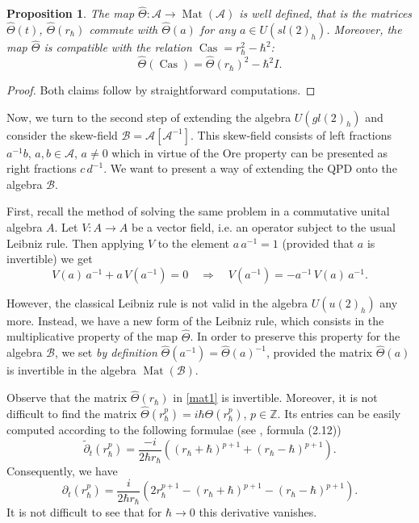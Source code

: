 \documentclass[10pt,a4paper]{amsart}
\newcommand{\pa}{\partial}
\renewcommand{\AA}{\mathcal{A}}
\DeclareMathOperator{\Cas}{Cas}
\newcommand{\tpa}{\widetilde{\pa}}
\newcommand{\hh}{\hbar}
\newcommand{\hatt}{\widehat{\Theta}}
\DeclareMathOperator{\Mat}{Mat}
\newcommand{\rh}{r_{\hbar}}
\newcommand{\Ah}{\mathcal{B}}
\numberwithin{equation}{section}
\newtheorem{proposition}[theorem]{Proposition}
\begin{document}
\begin{proposition}
The map $\hatt: \AA\to {\Mat}(\AA)$ is well defined, that is the matrices  $\hatt(t)$, $\hatt(\rh)$ commute with $\hatt(a)$
for any $ a\in U(sl(2)_h)$. Moreover, the map $\hatt$ is compatible with the relation ${\Cas}=\rh^2-\hh^2$:
\begin{equation}
\hatt({\Cas})=\hatt({\rh})^2-\hh^2 {I}.
\label{ree}
\end{equation}
\end{proposition}

\begin{proof}
Both claims follow by straightforward computations.
\end{proof}


Now, we turn to the second step of extending the algebra $U(gl(2)_h)$ and consider the skew-field $\Ah=\AA[\AA^{-1}]$. This
skew-field consists of left fractions $a^{-1} b$, $a,b \in\AA$, $a\not=0$ which in virtue of the Ore property can be presented as
right fractions $c\,d^{-1}$. We want to present a way of extending the QPD onto the algebra $\Ah$.

First, recall the method of solving the same problem in a commutative unital algebra $A$.
Let  $V:A\to A$ be a vector field,  i.e. an operator  subject to the usual Leibniz rule.
Then applying $V$ to the element $a\,a^{-1}=1$ (provided that $a$ is invertible) we get
\[
V(a)\,a^{-1}+a\,V(a^{-1})=0\quad \Rightarrow\quad V(a^{-1})=- a^{-1}\, V(a)\, a^{-1}.
\]

However, the classical Leibniz rule is not valid in the algebra $U(u(2)_h)$ any more. Instead, we have a new form of the Leibniz rule,
which consists in the multiplicative property of the map $\hatt$. In order to preserve this property for the algebra $\Ah$, we set
\emph{by definition} $\hatt(a^{-1})=\hatt(a)^{-1}$, provided the matrix $\hatt(a)$ is invertible in the algebra ${\Mat}(\Ah)$.


Observe that the matrix $\hatt(\rh)$ in \eqref{mat1} is invertible. Moreover, it is not difficult to find the matrix $\hatt(\rh^p)=i\hh \Theta(\rh^p)$,
$p\in \mathbb{Z}$. Its entries can be easily computed according to the following formulae (see  \cite{GS2}, formula (2.12))
\begin{equation}
\tpa_t(\rh^p)=\frac{-i}{2\hh\rh}((\rh+\hh)^{p+1}+(\rh-\hh)^{p+1}).
\label{pp}
\end{equation}
Consequently, we have
\begin{equation}
\pa_t(\rh^p)=\frac{i}{2\hh\rh}(2\rh^{p+1}-(\rh+\hh)^{p+1}-(\rh-\hh)^{p+1}).
\label{pppp}
\end{equation}
It is not difficult to see that for $\hh\to 0$ this derivative vanishes.
\end{document}
